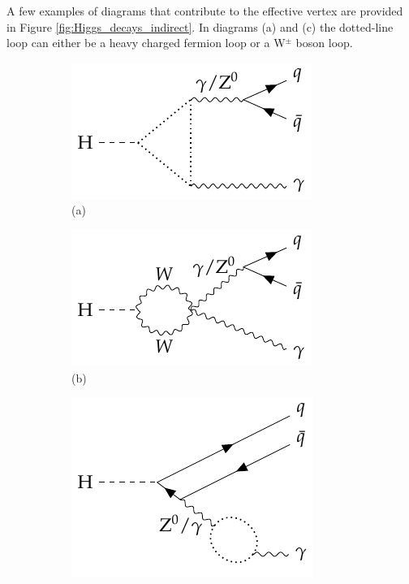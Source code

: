 A few examples of diagrams that contribute to the effective vertex are provided in Figure \ref{fig:Higgs_decays_indirect}. In diagrams (a) and (c) the dotted-line loop can either be a heavy charged fermion loop or a W$^{\pm}$ boson loop.
\begin{figure}[!ht]
    \captionsetup[subfigure]{labelformat=empty}
    \vspace*{-0.2cm}
    \centering
    \setlength{\mylength}{\textwidth}
    \begin{subfigure}[t]{0.333\mylength}
            \centering
            \includegraphics[width=0.323\mylength]{resources/H_rare_indirect/v1.pdf}%
            \caption{\footnotesize (a)}
    \end{subfigure}%
    \begin{subfigure}[t]{0.333\mylength}
            \centering
            \includegraphics[width=0.323\mylength]{resources/H_rare_indirect/v2.pdf}%
            \caption{\footnotesize (b)}
    \end{subfigure}%
    \begin{subfigure}[t]{0.333\mylength}
            \centering
            \includegraphics[width=0.323\mylength]{resources/H_rare_indirect/v4.pdf}%

\end{subfigure}
\end{figure}
